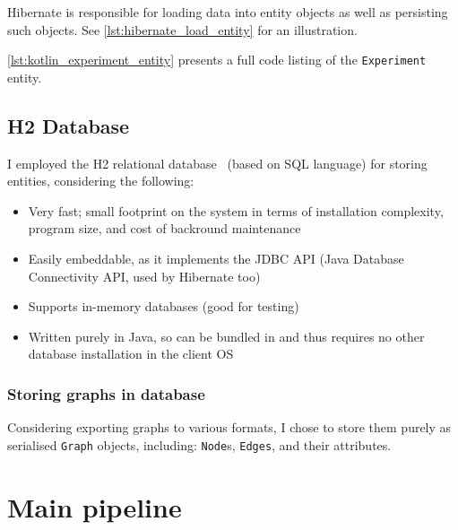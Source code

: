 \begin{itemize}[topsep=5pt,label=$\bm{\rightarrow}$]
    Hibernate is responsible for loading data into entity objects as well as persisting such objects.
    See \autoref{lst:hibernate_load_entity} for an illustration.

    
\end{itemize}


\autoref{lst:kotlin_experiment_entity} presents a full code listing of the \texttt{Experiment} entity.



\subsection{H2 Database}

I employed the H2 relational database~\cite{MuellerH2DatabaseEngine2006} (based on SQL language) for storing entities, considering the following:
\begin{itemize}[topsep=5pt]
    \item Very fast; small footprint on the system in terms of installation complexity, program size, and cost of backround maintenance
    \item Easily embeddable, as it implements the JDBC API (Java Database Connectivity API, used by Hibernate too)
    \item Supports in-memory databases (good for testing)
    \item Written purely in Java, so can be bundled in \graffs and thus requires no other database installation in the client OS
\end{itemize}

\subsubsection*{Storing graphs in database}

Considering exporting graphs to various formats, I chose to store them purely as serialised \texttt{Graph} objects, including: \texttt{Node}s, \texttt{Edges}, and their attributes.


\section{Main pipeline}\label{sec:main_pipeline}


